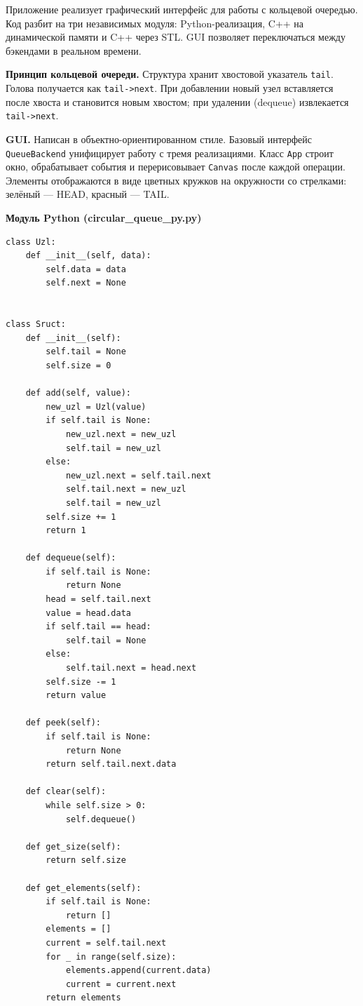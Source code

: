 \documentclass[oneside,a4paper,14pt]{extarticle}
\begin{document}
Приложение реализует графический интерфейс для работы с кольцевой очередью. Код разбит на три независимых модуля: Python-реализация, C++ на динамической памяти и C++ через STL. GUI позволяет переключаться между бэкендами в реальном времени.

\textbf{Принцип кольцевой очереди.} Структура хранит хвостовой указатель \texttt{tail}. Голова получается как \texttt{tail->next}. При добавлении новый узел вставляется после хвоста и становится новым хвостом; при удалении (dequeue) извлекается \texttt{tail->next}.

\textbf{GUI.} Написан в объектно-ориентированном стиле. Базовый интерфейс \texttt{QueueBackend} унифицирует работу с тремя реализациями. Класс \texttt{App} строит окно, обрабатывает события и перерисовывает \texttt{Canvas} после каждой операции. Элементы отображаются в виде цветных кружков на окружности со стрелками: зелёный --- HEAD, красный --- TAIL.

\newpage
\textbf{Модуль Python (circular\_queue\_py.py)}
\small
\begin{verbatim}
class Uzl:
    def __init__(self, data):
        self.data = data
        self.next = None


class Sruct:
    def __init__(self):
        self.tail = None
        self.size = 0

    def add(self, value):
        new_uzl = Uzl(value)
        if self.tail is None:
            new_uzl.next = new_uzl
            self.tail = new_uzl
        else:
            new_uzl.next = self.tail.next
            self.tail.next = new_uzl
            self.tail = new_uzl
        self.size += 1
        return 1

    def dequeue(self):
        if self.tail is None:
            return None
        head = self.tail.next
        value = head.data
        if self.tail == head:
            self.tail = None
        else:
            self.tail.next = head.next
        self.size -= 1
        return value

    def peek(self):
        if self.tail is None:
            return None
        return self.tail.next.data

    def clear(self):
        while self.size > 0:
            self.dequeue()

    def get_size(self):
        return self.size

    def get_elements(self):
        if self.tail is None:
            return []
        elements = []
        current = self.tail.next
        for _ in range(self.size):
            elements.append(current.data)
            current = current.next
        return elements
\end{verbatim}
\end{document}
